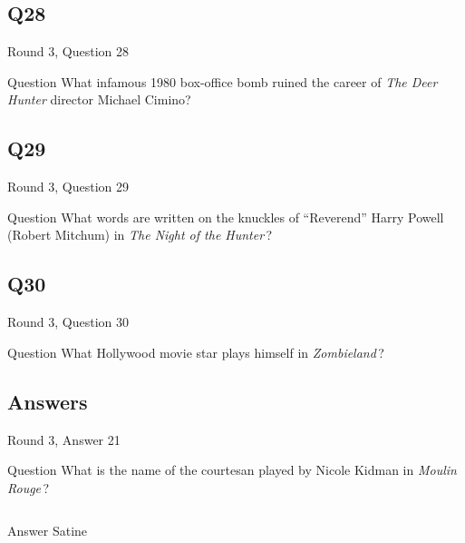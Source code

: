 \documentclass[11pt]{beamer}
\begin{document}
\subsection*{Q28}
\begin{frame}[t]{Round 3, Question 28}
\vspace{2em}
\begin{block}{Question}
What infamous 1980 box-office bomb ruined the career of \emph{The Deer Hunter} director Michael Cimino?
\end{block}
\end{frame}
    

\subsection*{Q29}
\begin{frame}[t]{Round 3, Question 29}
\vspace{2em}
\begin{block}{Question}
What words are written on the knuckles of ``Reverend'' Harry Powell (Robert Mitchum) in \emph{The Night of the Hunter}\,?
\end{block}
\end{frame}
    

\subsection*{Q30}
\begin{frame}[t]{Round 3, Question 30}
\vspace{2em}
\begin{block}{Question}
What Hollywood movie star plays himself in \emph{Zombieland}\,?
\end{block}
\end{frame}
    
\subsection{Answers}

\begin{frame}[t]{Round 3, Answer 21}
\vspace{2em}
\begin{block}{Question}
What is the name of the courtesan played by Nicole Kidman in \emph{Moulin Rouge}\,?
\end{block}
\pause{}
\begin{columns}[T,totalwidth=\linewidth]
\begin{column}{0.35\linewidth}
\begin{block}{Answer}
Satine
\end{block}
\end{column}
\begin{column}{0.6\linewidth}
\begin{center}
\texttt{[image: \{Images/moulin-rouge-nicole-kidman-004]}.jpg}
\end{center}
\end{column}
\end{columns}
\end{frame}
    
\end{document}
